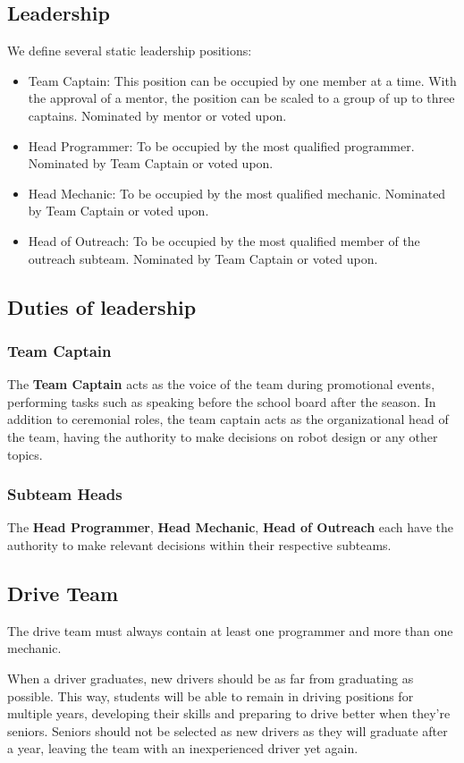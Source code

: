 \documentclass{proc}
\begin{document}
\subsection{Leadership}
We define several static leadership positions:
\begin{itemize}
  \item{Team Captain: This position can be occupied by one member at a time. With the approval of a mentor, the position can be scaled to a group of up to three captains. Nominated by mentor or voted upon.}
  \item{Head Programmer: To be occupied by the most qualified programmer. Nominated by Team Captain or voted upon.}
  \item{Head Mechanic: To be occupied by the most qualified mechanic. Nominated by Team Captain or voted upon.}
  \item{Head of Outreach: To be occupied by the most qualified member of the outreach subteam. Nominated by Team Captain or voted upon.}
\end{itemize}

\subsection{Duties of leadership}
\subsubsection{Team Captain}
The \textbf{Team Captain} acts as the voice of the team during promotional events, performing tasks such as speaking before the school board after the season. In addition to ceremonial roles, the team captain acts as the organizational head of the team, having the authority to make decisions on robot design or any other topics.

\subsubsection{Subteam Heads}
The \textbf{Head Programmer}, \textbf{Head Mechanic}, \textbf{Head of Outreach} each have the authority to make relevant decisions within their respective subteams.

\subsection{Drive Team}
The drive team must always contain at least one programmer and more than one mechanic.

When a driver graduates, new drivers should be as far from graduating as possible. This way, students will be able to remain in driving positions for multiple years, developing their skills and preparing to drive better when they're seniors. Seniors should not be selected as new drivers as they will graduate after a year, leaving the team with an inexperienced driver yet again.
\end{document}
